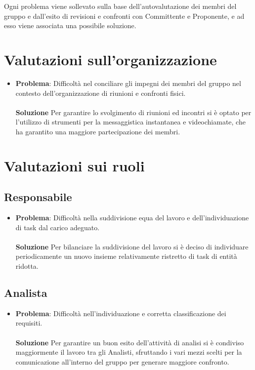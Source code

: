 \documentclass[openany,12pt,a4paper]{report}
\begin{document}
\noindent Ogni problema viene sollevato sulla base dell'autovalutazione dei membri del gruppo e dall'esito di revisioni e confronti con Committente e Proponente, e ad esso viene associata una possibile soluzione.

\section{Valutazioni sull'organizzazione}
\begin{itemize}
	\item \textbf{Problema}: Difficoltà nel conciliare gli impegni dei membri del gruppo nel contesto dell'organizzazione di riunioni e confronti fisici. \\ \\
	\textbf{Soluzione} Per garantire lo svolgimento di riunioni ed incontri si è optato per l'utilizzo di strumenti per la messaggistica instantanea e videochiamate, che ha garantito una maggiore partecipazione dei membri.
\end{itemize}

\section{Valutazioni sui ruoli}

\subsection{Responsabile}

\begin{itemize}
	\item \textbf{Problema}: Difficoltà nella suddivisione equa del lavoro e dell'individuazione di task dal carico adeguato. \\ \\
	\textbf{Soluzione} Per bilanciare la suddivisione del lavoro si è deciso di individuare periodicamente un nuovo insieme relativamente ristretto di task di entità ridotta.
\end{itemize}

\subsection{Analista}

\begin{itemize}
	\item \textbf{Problema}: Difficoltà nell'individuazione e corretta classificazione dei requisiti. \\ \\
	\textbf{Soluzione} Per garantire un buon esito dell'attività di analisi si è condiviso maggiormente il lavoro tra gli Analisti, sfruttando i vari mezzi scelti per la comunicazione
	all'interno del gruppo per generare maggiore confronto.
\end{itemize}
\end{document}
